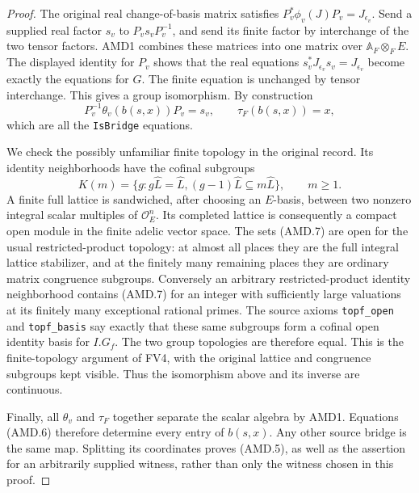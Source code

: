 \documentclass[11pt,a4paper]{article}
\numberwithin{equation}{section}
\theoremstyle{remark}\newtheorem{remark}[theorem]{Remark}
\begin{document}
\begin{proof}
The original real change-of-basis matrix satisfies
\(P_v^*\phi_v(J)P_v=J_{\epsilon_v}\).  Send a supplied real
factor \(s_v\) to \(P_vs_vP_v^{-1}\), and send its finite
factor by interchange of the two tensor factors.  AMD1 combines
these matrices into one matrix over \(\mathbb A_F\otimes_F E\).
The displayed identity for \(P_v\) shows that the real equations
\(s_v^*J_{\epsilon_v}s_v=J_{\epsilon_v}\) become exactly the
equations for \(G\).  The finite equation is unchanged by tensor
interchange.  This gives a group isomorphism.  By construction
\[
 P_v^{-1}\theta_v(b(s,x))P_v=s_v,
 \qquad \tau_F(b(s,x))=x,
 \tag{AMD.6}
\]
which are all the \texttt{Is\allowbreak Bridge} equations.

We check the possibly unfamiliar finite topology in the original
record.  Its identity neighborhoods have the cofinal subgroups
\[
 K(m)=\{g:g\widehat L=\widehat L,
                    (g-1)\widehat L\subseteq m\widehat L\},
                    \qquad m\ge1.
 \tag{AMD.7}
\]
A finite full lattice is sandwiched, after choosing an \(E\)-basis,
between two nonzero integral scalar multiples of \(\mathcal O_E^n\).
Its completed lattice is consequently a compact open module in
the finite adelic vector space.  The sets (AMD.7) are open for the
usual restricted-product topology: at almost all places they are
the full integral lattice stabilizer, and at the finitely many
remaining places they are ordinary matrix congruence subgroups.
Conversely an arbitrary restricted-product identity neighborhood
contains (AMD.7) for an integer with sufficiently large valuations
at its finitely many exceptional rational primes.  The source
axioms \texttt{topf\_\allowbreak open} and \texttt{topf\_\allowbreak basis} say exactly
that these same subgroups form a cofinal open identity basis for
\(I.G_f\).  The two group topologies are therefore equal.  This
is the finite-topology argument of FV4, with the original lattice
and congruence subgroups kept visible.  Thus the isomorphism above
and its inverse are continuous.

Finally, all \(\theta_v\) and \(\tau_F\) together separate
the scalar algebra by AMD1.  Equations (AMD.6) therefore determine
every entry of \(b(s,x)\).  Any other source bridge is the same
map.  Splitting its coordinates proves (AMD.5), as well as the
assertion for an arbitrarily supplied witness, rather than only
the witness chosen in this proof.
\end{proof}

\end{document}
